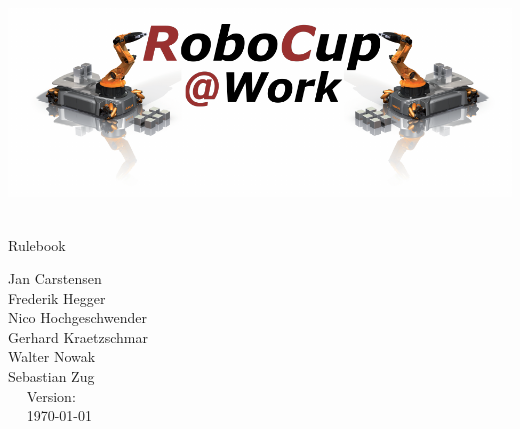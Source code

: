 \begin{titlepage}
  \begin{center}
    {
      
      \includegraphics[width=\textwidth]{images/logo_RoboCupAtWork.pdf}\\[1.23ex]
    }
    \vspace{2.7 cm}
    \hrulefill\par
    {%
      \vspace*{.27cm}
      \Huge{\RCAW}\\[1.23ex]
      \Large Rulebook \\[2ex]
    }
    



    \hrulefill\par
    
    \vfill

    
	Jan Carstensen\\
	Frederik Hegger\\
	Nico Hochgeschwender\\
	Gerhard Kraetzschmar\\
	Walter Nowak\\
	Sebastian Zug\\
    
    \vfill
    ~~ Version: \YEAR ~~ \\
    ~~  \today ~~ \\
  \end{center}
\end{titlepage}
